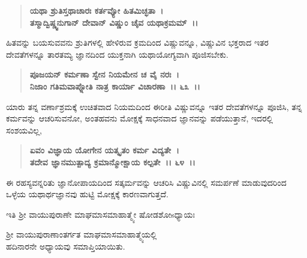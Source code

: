 \begin{verse}
\textbf{ಯಥಾ ಶ್ರುತಿಸ್ತಥಾಚಾರಃ ಕರ್ತವ್ಯೋ ಹಿತಮಿಚ್ಛತಾ~।}\\\textbf{ತಸ್ಮಾದ್ವಿಷ್ಣ್ವನುಗಾನ್ ದೇವಾನ್ ವಿಷ್ಣುಂ ಚೈವ ಯಥಾಕ್ರಮಮ್~।।}
\end{verse}

ಹಿತವನ್ನು ಬಯಸುವವನು ಶ್ರುತಿಗಳಲ್ಲಿ ಹೇಳಿರುವ ಕ್ರಮದಿಂದ ವಿಷ್ಣುವನ್ನೂ, ವಿಷ್ಣುವಿನ ಭಕ್ತರಾದ ಇತರ ದೇವತೆಗಳನ್ನೂ ತಾರತಮ್ಯ ಜ್ಞಾನದಿಂದ ಯುಕ್ತನಾಗಿ ಯಥಾಯೋಗ್ಯವಾಗಿ ಪೂಜಿಸಬೇಕು.

\begin{verse}
\textbf{ಪೂಜಯನ್ ಕರ್ಮಣಾ ಸ್ವೇನ ನಿಯಮೇನ ಚ ವೈ ನರಃ~।}\\\textbf{ನಿಜಾಂ ಗತಿಮವಾಪ್ನೋತಿ ನಾತ್ರ ಕಾರ್ಯಾ ವಿಚಾರಣಾ~।। ೬೩~।।}
\end{verse}

ಯಾರು ತನ್ನ ವರ್ಣಾಶ್ರಮಕ್ಕೆ ಉಚಿತವಾದ ನಿಯಮದಿಂದ ಈರೀತಿ ವಿಷ್ಣುವನ್ನೂ ಇತರ ದೇವತೆಗಳನ್ನೂ ಪೂಜಿಸಿ, ತನ್ನ ಕರ್ಮವನ್ನು ಆಚರಿಸುವನೋ, ಅಂತಹವನು ಮೋಕ್ಷಕ್ಕೆ ಸಾಧನವಾದ ಜ್ಞಾನವನ್ನು ಪಡೆಯುತ್ತಾನೆ, ಇದರಲ್ಲಿ ಸಂಶಯವಿಲ್ಲ,

\begin{verse}
\textbf{ಏವಂ ವಿಜ್ಞಾಯ ಯೋಗೇನ ಯತ್ಕೃತಂ ಕರ್ಮ ವಿದ್ಯತೇ~।}\\\textbf{ತದೇವ ಜ್ಞಾನಮುತ್ಪಾದ್ಯ ಕ್ರಮಾನ್ಮೋಕ್ಷಾಯ ಕಲ್ಪತೇ~।। ೬೪~।।}
\end{verse}

ಈ ರಹಸ್ಯವನ್ನರಿತು ಜ್ಞಾನೋಪಾಯದಿಂದ ಸತ್ಕರ್ಮವನ್ನು ಆಚರಿಸಿ ವಿಷ್ಣುವಿನಲ್ಲಿ ಸಮರ್ಪಣೆ ಮಾಡುವುದರಿಂದ ಒಳ್ಳೆಯ ಯಥಾರ್ಥಜ್ಞಾನವು ಹುಟ್ಟಿ ಮೋಕ್ಷಕ್ಕೆ ಕಾರಣವಾಗುತ್ತದೆ.

\begin{center}
ಇತಿ ಶ‍್ರೀ ವಾಯುಪುರಾಣೇ ಮಾಘಮಾಸಮಾಹಾತ್ಮ್ಯೇ ಷೋಡಶೋsಧ್ಯಾಯಃ
\end{center}

\begin{center}
ಶ‍್ರೀ ವಾಯುಪುರಾಣಾಂತರ್ಗತ ಮಾಘಮಾಸಮಾಹಾತ್ಮ್ಯೆಯಲ್ಲಿ \\ ಹದಿನಾರನೇ ಅಧ್ಯಾಯವು ಸಮಾಪ್ತಿಯಾಯಿತು.
\end{center}

\delimiter

